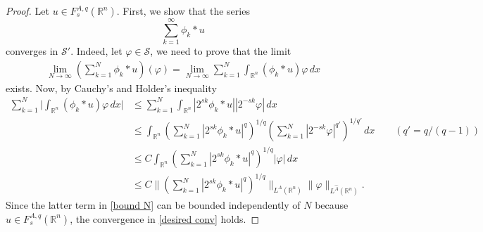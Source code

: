 \documentclass[leqno,twoside, 12pt]{amsart}
\theoremstyle{plain}
\numberwithin{equation}{section} \numberwithin{figure}{section}
\theoremstyle{definition}
\newcommand{\R}{\mathbb R}
\numberwithin{equation}{section}
\begin{document}
\begin{proof}
Let $u\in F_s^{A,q}(\R^n)$. First, we show that the series 
$$\sum_{k=1}^\infty \phi_k*u$$converges in $\mathcal{S}'$. Indeed, let $\varphi\in \mathcal{S}$, we need to prove that the limit
\begin{equation}\label{desired conv}
\begin{split}
\lim_{N\to \infty}\left(\sum_{k=1}^N \phi_k*u\right)(\varphi)=\lim_{N\to \infty}\sum_{k=1}^N \int_{\R^n} (\phi_k*u)\varphi\,dx 
\end{split}
\end{equation}exists. Now, by Cauchy's and Holder's  inequality
\begin{equation}\label{bound N}
\begin{split}
\sum_{k=1}^N \bigg|\int_{\R^n} (\phi_k*u)\varphi\,dx\bigg|  &\leq  \sum_{k=1}^N \int_{\R^n} |2^{sk} \phi_k*u||2^{-sk}\varphi|\,dx \\&\leq \int_{\R^n}\left(\sum_{k=1}^N  |2^{sk}\phi_k*u|^q\right)^{1/q}\left(\sum_{k=1}^N |2^{-sk}\varphi|^{q'}\right)^{1/q'}\,dx \qquad (q'=q/(q-1))\\& \leq C\int_{\R^n}\left(\sum_{k=1}^N  |2^{sk}\phi_k*u|^q\right)^{1/q}|\varphi|\,dx
\\ & \leq C \bigg\|\left(\sum_{k=1}^N  |2^{sk}\phi_k*u|^q\right)^{1/q}\bigg\|_{L^A(\R^n)}\|\varphi\|_{L^{\hat A}(\R^n)}.
\end{split}
\end{equation}Since the latter term in \eqref{bound N} can be bounded independently of $N$ because $u\in F_s^{A,q}(\R^n)$, the convergence in \eqref{desired conv} holds. 


\end{proof}
\end{document}
